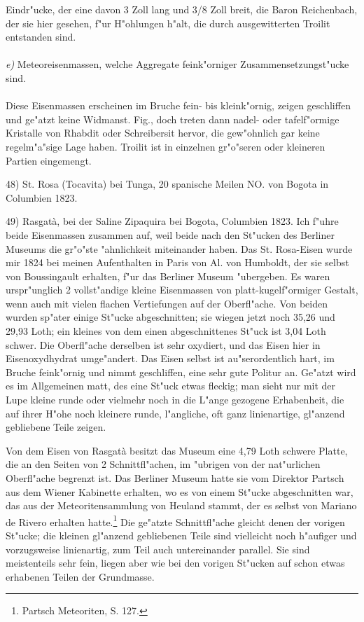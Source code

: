 \documentclass[a4paper, 11pt, oneside]{article}
\begin{document}
Eindr"ucke, der eine davon 3 Zoll lang und 3/8 Zoll breit, die Baron Reichenbach, der sie hier gesehen, f"ur H"ohlungen h"alt, die durch ausgewitterten Troilit entstanden sind.
\vspace{\medskipamount}
\paragraph{}
\emph{e)} Meteoreisenmassen, welche Aggregate feink"orniger Zusammensetzungst"ucke sind.
\vspace{\medskipamount}
\paragraph{}
Diese Eisenmassen erscheinen im Bruche fein- bis kleink"ornig, zeigen geschliffen und ge"atzt keine Widmanst. Fig., doch treten dann nadel- oder tafelf"ormige Kristalle von Rhabdit oder Schreibersit hervor, die gew"ohnlich gar keine regelm"a"sige Lage haben. Troilit ist in einzelnen gr"o"seren oder kleineren Partien eingemengt.

48) St. Rosa (Tocavita) bei Tunga, 20 spanische Meilen NO. von Bogota in Columbien 1823.

49) Rasgatà, bei der Saline Zipaquira bei Bogota, Columbien 1823. Ich f"uhre beide Eisenmassen zusammen auf, weil beide nach den St"ucken des Berliner Museums die gr"o"ste "ahnlichkeit miteinander haben. Das St. Rosa-Eisen wurde mir 1824 bei meinen Aufenthalten in Paris von Al. von Humboldt, der sie selbst von Boussingault erhalten, f"ur das Berliner Museum "ubergeben. Es waren urspr"unglich 2 vollst"andige kleine Eisenmassen von platt-kugelf"ormiger Gestalt, wenn auch mit vielen flachen Vertiefungen auf der Oberfl"ache. Von beiden wurden sp"ater einige St"ucke abgeschnitten; sie wiegen jetzt noch 35,26 und 29,93 Loth; ein kleines von dem einen abgeschnittenes St"uck ist 3,04 Loth schwer. Die Oberfl"ache derselben ist sehr oxydiert, und das Eisen hier in Eisenoxydhydrat umge"andert. Das Eisen selbst ist au"serordentlich hart, im Bruche feink"ornig und nimmt geschliffen, eine sehr gute Politur an. Ge"atzt wird es im Allgemeinen matt, des eine St"uck etwas fleckig; man sieht nur mit der Lupe kleine runde oder vielmehr noch in die L"ange gezogene Erhabenheit, die auf ihrer H"ohe noch kleinere runde, l"angliche, oft ganz linienartige, gl"anzend gebliebene Teile zeigen.

Von dem Eisen von Rasgatà besitzt das Museum eine 4,79 Loth schwere Platte, die an den Seiten von 2 Schnittfl"achen, im "ubrigen von der nat"urlichen Oberfl"ache begrenzt ist. Das Berliner Museum hatte sie vom Direktor Partsch aus dem Wiener Kabinette erhalten, wo es von einem St"ucke abgeschnitten war, das aus der Meteoritensammlung von Heuland stammt, der es selbst von Mariano de Rivero erhalten hatte.\footnote{Partsch Meteoriten, S. 127.} Die ge"atzte Schnittfl"ache gleicht denen der vorigen St"ucke; die kleinen gl"anzend gebliebenen Teile sind vielleicht noch h"aufiger und vorzugsweise linienartig, zum Teil auch untereinander parallel. Sie sind meistenteils sehr fein, liegen aber wie bei den vorigen St"ucken auf schon etwas erhabenen Teilen der Grundmasse.
\end{document}
